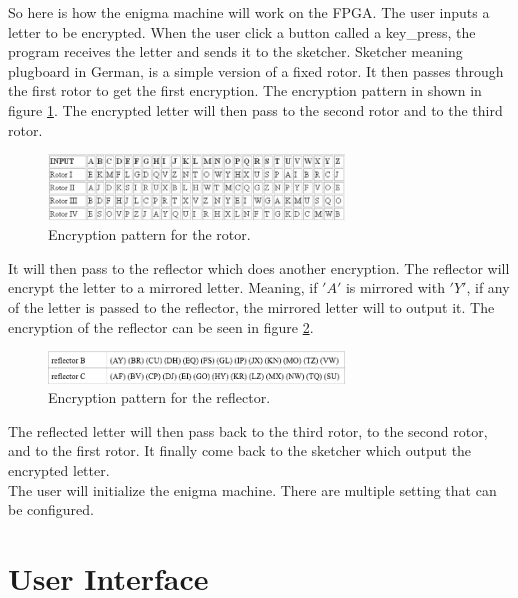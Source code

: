 \documentclass[10pt]{article}
\begin{document}
So here is how the enigma machine will work on the FPGA. The user inputs a letter to be encrypted. When the user click a button called a key\_press, the program receives the letter and sends it to the sketcher. Sketcher meaning plugboard in German, is a simple version of a fixed rotor. It then passes through the first rotor to get the first encryption. The encryption pattern in shown in figure \ref{fig:rotor_encryption}. The encrypted letter will then pass to the second rotor and to the third rotor.
\begin{figure}[!htb]
    \centering
    \includegraphics[width=0.7\textwidth]{./rotor_encryption.png}
    \caption{Encryption pattern for the rotor.}
    \label{fig:rotor_encryption}
\end{figure}
It will then pass to the reflector which does another encryption. The reflector will encrypt the letter to a mirrored letter. Meaning, if $'A'$ is mirrored with $'Y'$, if any of the letter is passed to the reflector, the mirrored letter will to output it. The encryption of the reflector can be seen in figure \ref{fig:reflector_encryption}.
\begin{figure}[!htb]
    \centering
    \includegraphics[width=0.7\textwidth]{./reflector_encryption.png}
    \caption{Encryption pattern for the reflector.}
    \label{fig:reflector_encryption}
\end{figure}
The reflected letter will then pass back to the third rotor, to the second rotor, and to the first rotor. It finally come back to the sketcher which output the encrypted letter.\\ 
The user will initialize the enigma machine. There are multiple setting that can be configured.

\section{User Interface}
\end{document}
